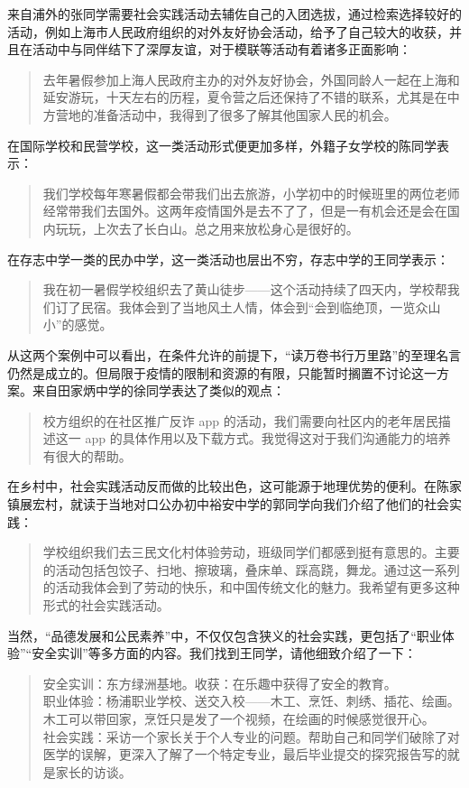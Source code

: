 \documentclass[12pt,UTF8]{ctexart}
\begin{document}
\par {
	
	来自浦外的张同学需要社会实践活动去辅佐自己的入团选拔，通过检索选择较好的活动，例如上海市人民政府组织的对外友好协会活动，给予了自己较大的收获，并且在活动中与同伴结下了深厚友谊，对于模联等活动有着诸多正面影响：
	\begin{quote}
		\kaishu
		去年暑假参加上海人民政府主办的对外友好协会，外国同龄人一起在上海和延安游玩，十天左右的历程，夏令营之后还保持了不错的联系，尤其是在中方营地的准备活动中，我得到了很多了解其他国家人民的机会。
	\end{quote}
	在国际学校和民营学校，这一类活动形式便更加多样，外籍子女学校的陈同学表示：
	\begin{quote}
		\kaishu
		我们学校每年寒暑假都会带我们出去旅游，小学初中的时候班里的两位老师经常带我们去国外。这两年疫情国外是去不了了，但是一有机会还是会在国内玩玩，上次去了长白山。总之用来放松身心是很好的。
	\end{quote}
	在存志中学一类的民办中学，这一类活动也层出不穷，存志中学的王同学表示：
	\begin{quote}
		\kaishu
		我在初一暑假学校组织去了黄山徒步——这个活动持续了四天内，学校帮我们订了民宿。我体会到了当地风土人情，体会到“会到临绝顶，一览众山小”的感觉。
	\end{quote}
	
	从这两个案例中可以看出，在条件允许的前提下，“读万卷书行万里路”的至理名言仍然是成立的。但局限于疫情的限制和资源的有限，只能暂时搁置不讨论这一方案。来自田家炳中学的徐同学表达了类似的观点：
	\begin{quote}
		\kaishu 校方组织的在社区推广反诈 app  的活动，我们需要向社区内的老年居民描述这一 app
		的具体作用以及下载方式。我觉得这对于我们沟通能力的培养有很大的帮助。
	\end{quote}
	在乡村中，社会实践活动反而做的比较出色，这可能源于地理优势的便利。在陈家镇展宏村，就读于当地对口公办初中裕安中学的郭同学向我们介绍了他们的社会实践：
	\begin{quote}
		\kaishu
		学校组织我们去三民文化村体验劳动，班级同学们都感到挺有意思的。主要的活动包括包饺子、扫地、擦玻璃，叠床单、踩高跷，舞龙。通过这一系列的活动我体会到了劳动的快乐，和中国传统文化的魅力。我希望有更多这种形式的社会实践活动。
	\end{quote}
	当然，“品德发展和公民素养”中，不仅仅包含狭义的社会实践，更包括了“职业体验”“安全实训”等多方面的内容。我们找到王同学，请他细致介绍了一下：
	\begin{quote}
		\kaishu 安全实训：东方绿洲基地。收获：在乐趣中获得了安全的教育。\\
		职业体验：杨浦职业学校、送交入校——木工、烹饪、刺绣、插花、绘画。木工可以带回家，烹饪只是发了一个视频，在绘画的时候感觉很开心。\\
		社会实践：采访一个家长关于个人专业的问题。帮助自己和同学们破除了对医学的误解，更深入了解了一个特定专业，最后毕业提交的探究报告写的就是家长的访谈。
	\end{quote} 
}
\end{document}
